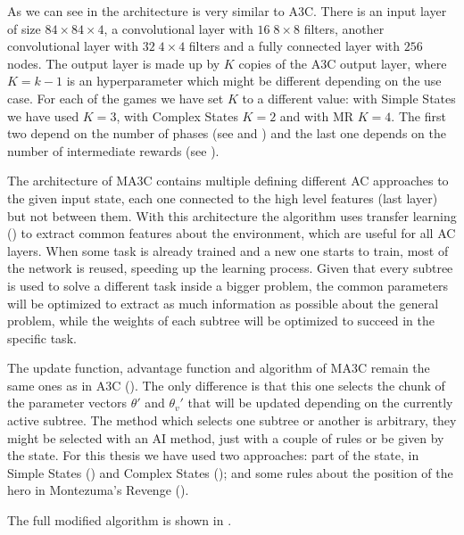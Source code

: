 As we can see in  the architecture is very similar to \ac{A3C}.
There is an input layer of size $84 \times 84 \times 4$, a convolutional layer with $16\; 8 \times 8$ filters, another
convolutional layer with $32 \; 4 \times 4$ filters and a fully connected layer with $256$ nodes.
The output layer is made up by $K$ copies of the \ac{A3C} output layer, where $K = k-1$ is an hyperparameter which might be
different depending on the use case.
For each of the games we have set $K$ to a different value: with Simple States we have used $K=3$, with Complex States
$K=2$ and with \ac{MR} $K=4$.
The first two depend on the number of phases (see  and ) and the last one
depends on the number of intermediate rewards (see ).

The architecture of \ac{MA3C} contains multiple  defining different \acl{AC} approaches to the given input state,
each one connected to the high level features (last layer) but not between them.
With this architecture the algorithm uses transfer learning () to extract common features
about the environment, which are useful for all \ac{AC} layers.
When some task is already trained and a new one starts to train, most of the network is reused, speeding up the learning
process.
Given that every subtree is used to solve a different task inside a bigger problem, the common parameters will be optimized to
extract as much information as possible about the general problem, while the weights of each subtree will be optimized to
succeed in the specific task.

The update function, advantage function and algorithm of \ac{MA3C} remain the same ones as in \ac{A3C} ().
The only difference is that this one selects the chunk of the parameter vectors $\theta'$ and $\theta_{v}'$ that will be updated
depending on the currently active subtree.
The method which selects one subtree or another is arbitrary, they might be selected with an \ac{AI} method, just
with a couple of rules or be given by the state.
For this thesis we have used two approaches: part of the state, in Simple States () and Complex States
(); and some rules about the position of the hero in Montezuma's Revenge ().

The full modified algorithm is shown in .

